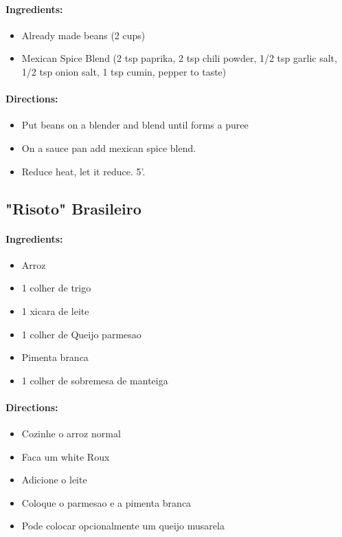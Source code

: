 \documentclass{article}
\begin{document}
\paragraph{Ingredients:}

\begin{itemize}
	\item Already made beans (2 cups)
	\item Mexican Spice Blend (2 tsp paprika, 2 tsp chili powder, 1/2 tsp garlic salt, 1/2 tsp onion salt, 1 tsp cumin, pepper to taste)
\end{itemize}

\paragraph{Directions:}
\begin{itemize}
	\item Put beans on a blender and blend until forms a puree
	\item On a sauce pan add mexican spice blend.
	\item Reduce heat, let it reduce. 5'.
\end{itemize} 

\subsection{"Risoto" Brasileiro}

\paragraph{Ingredients:}

\begin{itemize}
	\item Arroz
	\item 1 colher de trigo
	\item 1 xicara de leite
	\item 1 colher de Queijo parmesao
	\item Pimenta branca
	\item 1 colher de sobremesa de manteiga
\end{itemize}

\paragraph{Directions:}
\begin{itemize}
	\item Cozinhe o arroz normal
	\item Faca um white Roux
	\item Adicione o leite
	\item Coloque o parmesao e a pimenta branca
	\item Pode colocar opcionalmente um queijo musarela
\end{itemize} 
\end{document}
